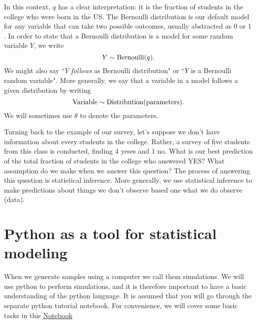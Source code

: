  In this context, $q$ has a clear interpretation: it is the fraction of students in the college who were born in the US. The Bernoulli distribution is our default model for any variable that can take two possible outcomes, usually abstracted as $0$ or $1$.  In order to state that a Bernoulli distribution is a model for some random variable $Y$, we write
\begin{equation}
Y \sim {\rm Bernoulli}(q).
\end{equation}
We might also say ``$Y$ \emph{follows} as Bernoulli distribution" or ``$Y$ is a Bernoulli random variable".
More generally, we say that a variable in a model follows a given distribution by writing
\begin{equation}
{\rm Variable} \sim {\rm Distribution}({\rm parameters}).
\end{equation}
We will sometimes use $\theta$ to denote the parameters. 


Turning back to the example of our survey, let's suppose we don't have information about every students in the college. Rather, a survey of five students from this class is conducted, finding $4$ yeses and $1$ no. What is our best prediction of the total fraction of students in the college who answered YES? What assumption do we make when we answer this question? The process of answering this question is {\dfn statistical inference}. More generally, we use statistical inference to make predictions about things we don't observe based one what we do observe (data). 




\section{Python as a tool for statistical modeling}
When we generate samples using a computer we call them {\dfn simulations}. We will use python to perform simulations, and it is therefore important to have a basic understanding of the python language. It is assumed that you will go through the separate python tutorial notebook. For convenience, we will cover some basic tasks in this \href{https://colab.research.google.com/drive/1Gs-gSsUP1hHVwhrbwvWzLVm1ulcLJKRI#scrollTo=_c4br6SCUtUy}{Notebook}


